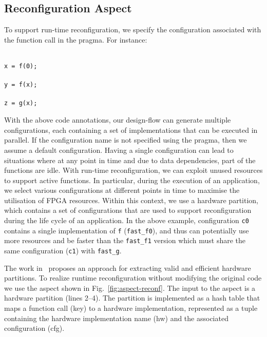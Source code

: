 \subsection{Reconfiguration Aspect}
\label{sect:asp_reconfig}
To support run-time reconfiguration, we specify the configuration
associated with the function call in the \MAXC{} pragma. For instance:

\vspace{3mm}
\noindent\texttt{\footnotesize{\\
x = f(0); \\
\\
y = f(x); \\
\\
z = g(x); \\
}}

\noindent With the above code annotations, our design-flow can
generate multiple configurations, each containing a set of \MAXC{}
implementations that can be executed in parallel. If the configuration
name is not specified using the \MAXC{} pragma, then we assume a
default configuration. Having a single configuration can lead to
situations where at any point in time and due to data dependencies,
part of the functions are idle. With run-time reconfiguration, we can
exploit unused resources to support active functions. In particular,
during the execution of an application, we select various
configurations at different points in time to maximise the utilisation
of FPGA resources. Within this context, we use a hardware partition,
which contains a set of configurations that are used to support
reconfiguration during the life cycle of an application. In the above
example, configuration \texttt{c0} contains a single implementation of
\texttt{f} (\texttt{fast\_f0}), and thus can potentially use more
resources and be faster than the \texttt{fast\_f1} version which must
share the same configuration (\texttt{c1}) with \texttt{fast\_g}.

The work in~\cite{Xinyu:Qiwei:Luk:Qiang:Pell:2012} proposes an
approach for extracting valid and efficient hardware partitions. To realize
runtime reconfiguration without modifying the original code we use the
aspect shown in Fig.~\ref{fig:aspect-reconf}.  The input to the
aspect is a hardware partition (lines 2--4). The partition is implemented as a
hash table that maps a function call (key) to a hardware
implementation, represented as a tuple containing the hardware
implementation name (hw) and the associated configuration (cfg).

